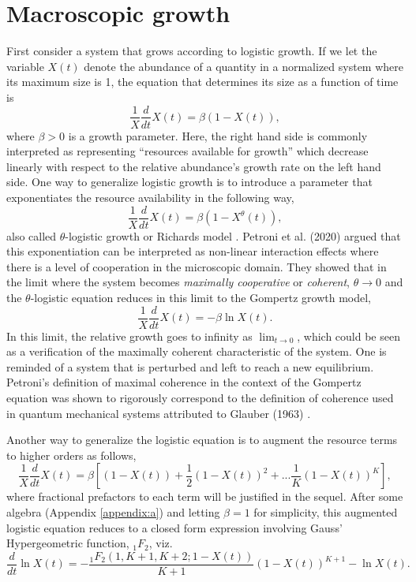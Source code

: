 \documentclass{article}
\begin{document}
\section{Macroscopic growth}
\label{sec:macro}

First consider a system that grows according to logistic growth. If we let the variable $X(t)$ denote the abundance of a quantity in a normalized system where its maximum size is 1, the equation that determines its size as a function of time is
\begin{equation}
  \frac{1}{X}\frac{d}{dt} X(t) = \beta (1 - X(t)),
\end{equation}
where $\beta>0$ is a growth parameter. Here, the right hand side is commonly interpreted as representing ``resources available for growth'' which decrease linearly with respect to the relative abundance's growth rate on the left hand side. One way to generalize logistic growth is to introduce a parameter that exponentiates the resource availability in the following way,
\begin{equation}
\label{eq:Rich}
  \frac{1}{X}\frac{d}{dt} X(t) = \beta (1 - X^{\theta}(t)),
\end{equation}
also called $\theta$-logistic growth or Richards model \citep{richards1959flexible}. Petroni et al. (2020) argued that this exponentiation can be interpreted as non-linear interaction effects where there is a level of cooperation in the microscopic domain. They showed that in the limit where the system becomes \textit{maximally cooperative} or \textit{coherent}, $\theta\rightarrow 0$ and the $\theta$-logistic equation reduces in this limit to the Gompertz growth model,
 \begin{equation}
 \label{eq:Gomp}
  \frac{1}{X}\frac{d}{dt} X(t) = - \beta \ln X(t).
\end{equation}
In this limit, the relative growth goes to infinity as $\lim_{t\to 0}$, which could be seen as a verification of the maximally coherent characteristic of the system. One is reminded of a system that is perturbed and left to reach a new equilibrium. Petroni's definition of maximal coherence in the context of the Gompertz equation was shown to rigorously correspond to the definition of coherence used in quantum mechanical systems \cite{molski2003coherent} attributed to Glauber (1963) \cite{glauber1963coherent}.

Another way to generalize the logistic equation is to augment the resource terms to higher orders as follows,
\begin{equation}
  \frac{1}{X}\frac{d}{dt} X(t) = \beta \left[(1 - X(t)) + \frac{1}{2}(1 - X(t))^2 + ... \frac{1}{K}(1 - X(t))^K\right],
\end{equation}
where fractional prefactors to each term will be justified in the sequel.
After some algebra (Appendix \ref{appendix:a}) and letting $\beta=1$ for simplicity, this augmented logistic equation reduces to a closed form expression involving Gauss' Hypergeometric function, ${}_1F_{2}$, viz.
\begin{equation}
 \label{eq:modLogistic}
\frac{d}{dt}\ln{X(t)} = - \frac{{}_{1}F_{2}({1,K+1,K+2;1-X(t)})}{K+1}(1-X(t))^{K+1} - \ln{X(t)}.
 \end{equation}
\end{document}
